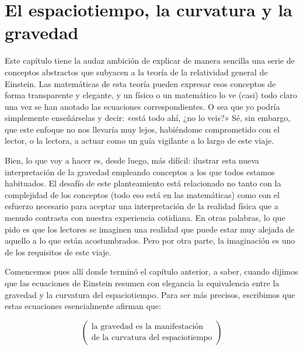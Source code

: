 
\chapter{El espaciotiempo, la curvatura y la gravedad}\label{ch:03}


Este capítulo tiene la audaz ambición de explicar de manera sencilla una serie de conceptos
abstractos que subyacen a la teoría de la relatividad general de Einstein. Las matemáticas de
esta teoría pueden expresar esos conceptos de forma transparente y elegante, y un físico o un
matemático lo ve (casi) todo claro una vez se han anotado las ecuaciones correspondientes. O
sea que yo podría simplemente enseñárselas y decir: «está todo ahí, ¿no lo veis?» Sé, sin
embargo, que este enfoque no nos llevaría muy lejos, habiéndome comprometido con el lector, o
la lectora, a actuar como un guía vigilante a lo largo de este viaje.

Bien, lo que voy a hacer es, desde luego, más difícil: ilustrar esta nueva interpretación de la
gravedad empleando conceptos a los que todos estamos habituados. El desafío de este
planteamiento está relacionado no tanto con la complejidad de los conceptos (todo eso está en
las matemáticas) como con el esfuerzo necesario para aceptar una interpretación de la realidad
física que a menudo contrasta con nuestra experiencia cotidiana. En otras palabras, lo que pido
es que los lectores se imaginen una realidad que puede estar muy alejada de aquello a lo que
están acostumbrados. Pero por otra parte, la imaginación es uno de los requisitos de este
viaje.

Comencemos pues allí donde terminó el capítulo anterior, a saber, cuando dijimos que las
ecuaciones de Einstein resumen con elegancia la equivalencia entre la gravedad y la curvatura
del espaciotiempo. Para ser más precisos, escribimos que estas ecuaciones esencialmente afirman
que:

\begin{equation}\label{eq:03-01}
\begin{pmatrix}\text{la gravedad es la manifestación} \\ \text{de la curvatura del espaciotiempo}\end{pmatrix}
\end{equation}

